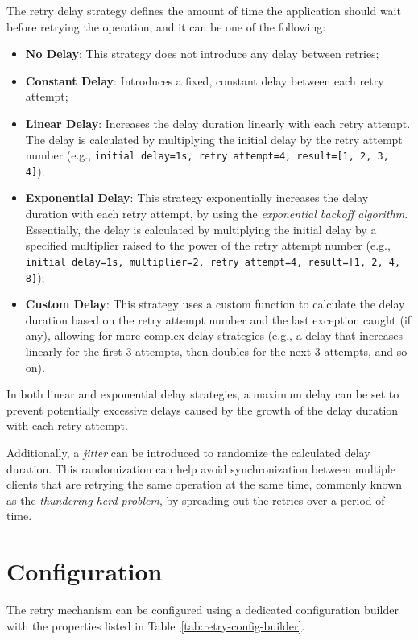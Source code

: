 The retry delay strategy defines the amount of time the application should wait before retrying the operation, and it can be one of the following:

\begin{itemize}
    \item \textbf{No Delay}: This strategy does not introduce any delay between retries;
    \item \textbf{Constant Delay}: Introduces a fixed, constant delay between each retry attempt;
    \item \textbf{Linear Delay}: Increases the delay duration linearly with each retry attempt.
    The delay is calculated by multiplying the initial delay by the retry attempt number (e.g., \texttt{initial delay=1s, retry attempt=4, result=[1, 2, 3, 4]});
    \item \textbf{Exponential Delay}: This strategy exponentially increases the delay duration with each retry attempt, by using the \textit{exponential backoff algorithm}.
    Essentially, the delay is calculated by multiplying the initial delay by a specified multiplier raised to the power of the retry attempt number (e.g., \texttt{initial delay=1s, multiplier=2, retry attempt=4, result=[1, 2, 4, 8]});
    \item \textbf{Custom Delay}: This strategy uses a custom function to calculate the delay duration based on the retry attempt number and the last exception caught (if any), allowing for more complex delay strategies (e.g., a delay that increases linearly for the first 3 attempts, then doubles for the next 3 attempts, and so on).
\end{itemize}

In both linear and exponential delay strategies, a maximum delay can be set to prevent potentially excessive delays caused by the growth of the delay duration with each retry attempt.

Additionally, a \textit{jitter} can be introduced to randomize the calculated delay duration.
This randomization can help
avoid synchronization between multiple clients that are retrying the same operation at the same time,
commonly known as the \textit{thundering herd problem}, by spreading out the retries over a period of time.


\section{Configuration}\label{sec:retry-configuration}

The retry mechanism can be configured using a dedicated configuration builder with the properties listed in Table~\ref{tab:retry-config-builder}.

